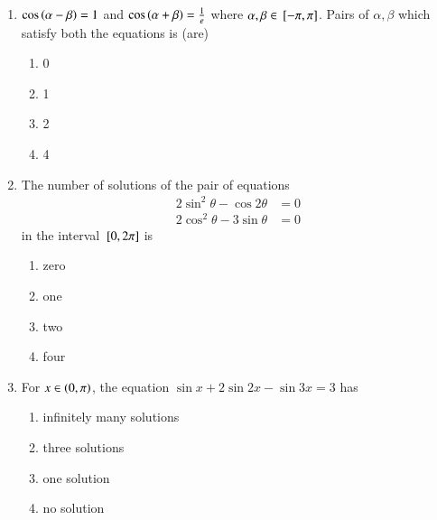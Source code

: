 \begin{enumerate}[label=\thesubsection.\arabic*,ref=\thesubsection.\theenumi]
\hfill{}
\begin{multicols}{4}
\begin{enumerate}
\item $(\frac{\pi}{3},\frac{\pi}{2}]$
\item $\brak{\frac{\pi}{2},\frac{2\pi}{3}}$
\item $(\frac{2\pi}{3},\frac{5\pi}{6}]$
\item $(\frac{5\pi}{6},\pi]$
\end{enumerate}
\end{multicols}
\item $\cos\left(\alpha - \beta\right)=1$ and $\cos\left(\alpha + \beta\right)=\frac{1}{e}$ where $\alpha, \beta \in {}\left[-\pi,\pi\right]$. Pairs of $\alpha, \beta$ which satisfy both the equations is (are)
\hfill{}
\begin{multicols}{4}
\begin{enumerate}
\item 0
\item 1
\item 2
\item 4 
\end{enumerate}
\end{multicols}
\item The number of solutions of the pair of equations
\begin{align*}
	2\sin^2\theta - \cos2\theta &= 0
\\
2\cos^2\theta - 3\sin\theta &= 0
\end{align*}
in the interval ${}\left[0,2\pi\right]$ is
\hfill{}
\begin{multicols}{4}
\begin{enumerate}
\item zero
\item one
\item two
\item four
\end{enumerate}
\end{multicols}
\item For $x \in \left(0,\pi\right)$, the equation $\sin x + 2\sin 2x - \sin 3x = 3$ has
\hfill{}
\begin{multicols}{2}
\begin{enumerate}
\item infinitely many solutions
\item three solutions
\item one solution
\item no solution
\end{enumerate}

\end{multicols}
\end{enumerate}
